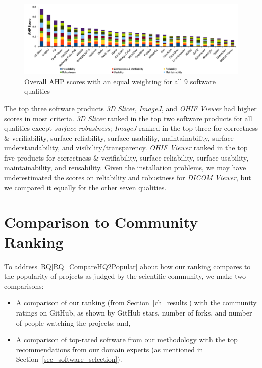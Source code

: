 \documentclass[final, 3p, times, authoryear]{elsarticle}
\newcommand{\rqref}[1]{RQ\ref{#1}}
\begin{document}
\begin{figure}[!ht]
\includegraphics[scale=0.48]{figures/overall_scores.pdf}
\caption{Overall AHP scores with an equal weighting for all 9 software qualities}

\label{fg_overall_scores}
\end{figure}

The top three software products \textit{3D Slicer}, \textit{ImageJ}, and
\textit{OHIF Viewer} had higher scores in most criteria. \textit{3D Slicer}
ranked in the top two software products for all qualities except \textit{surface
robustness}; \textit{ImageJ} ranked in the top three for correctness \&
verifiability, surface reliability, surface usability, maintainability, surface
understandability, and visibility/transparency. \textit{OHIF Viewer} ranked in
the top five products for correctness \& verifiability, surface reliability,
surface usability, maintainability, and reusability. Given the installation
problems, we may have underestimated the scores on reliability and robustness
for \textit{DICOM Viewer}, but we compared it equally for the other seven
qualities.

\section{Comparison to Community Ranking} \label{Sec_VsCommunityRanking}

To address~\rqref{RQ_CompareHQ2Popular} about how our ranking compares to the
popularity of projects as judged by the scientific community, we make two
comparisons:
\begin{itemize}
\item A comparison of our ranking (from Section~\ref{ch_results}) with the
community ratings on GitHub, as shown by GitHub stars, number of forks, and
number of people watching the projects; and,
\item A comparison of top-rated software from our methodology with the top
recommendations from our domain experts (as mentioned in
Section~\ref{sec_software_selection}).
\end{itemize}
\end{document}
